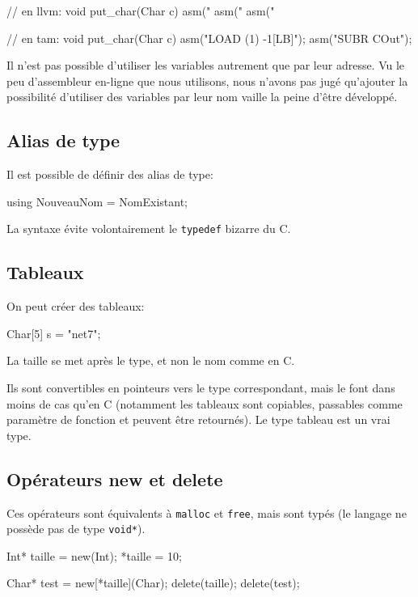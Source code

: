 \documentclass{scrartcl}
\begin{document}
    \begin{moccode}
// en llvm:
void put_char(Char c) {
    asm("%
    asm("%
    asm("%
}

// en tam:
void put_char(Char c) {
    asm("LOAD (1) -1[LB]");
    asm("SUBR COut");
}
    \end{moccode}

    Il n'est pas possible d'utiliser les variables autrement que par leur
    adresse. Vu le peu d'assembleur en-ligne que nous utilisons, nous n'avons
    pas jugé qu'ajouter la possibilité d'utiliser des variables par leur nom
    vaille la peine d'être développé.

  \subsection{Alias de type}\label{sec:alias}
    Il est possible de définir des alias de type:
    \begin{moccode}
using NouveauNom = NomExistant;
    \end{moccode}

    La syntaxe évite volontairement le \verb+typedef+ bizarre du C.

  \subsection{Tableaux}\label{sec:tab}
    On peut créer des tableaux:
    \begin{moccode}
Char[5] s = "net7";
    \end{moccode}

    La taille se met après le type, et non le nom comme en C.

    Ils sont convertibles en pointeurs vers le type correspondant, mais le font
    dans moins de cas qu'en C (notamment les tableaux sont copiables,
    passables comme paramètre de fonction et peuvent être retournés). Le type
    tableau est un vrai type.

  \subsection{Opérateurs new et delete}\label{sec:new}
    Ces opérateurs sont équivalents à \verb+malloc+ et \verb+free+, mais sont
    typés (le langage ne possède pas de type \verb+void*+).

    \begin{moccode}
Int* taille = new(Int);
*taille = 10;

Char* test = new[*taille](Char);
delete(taille);
delete(test);
    \end{moccode}
\end{document}

